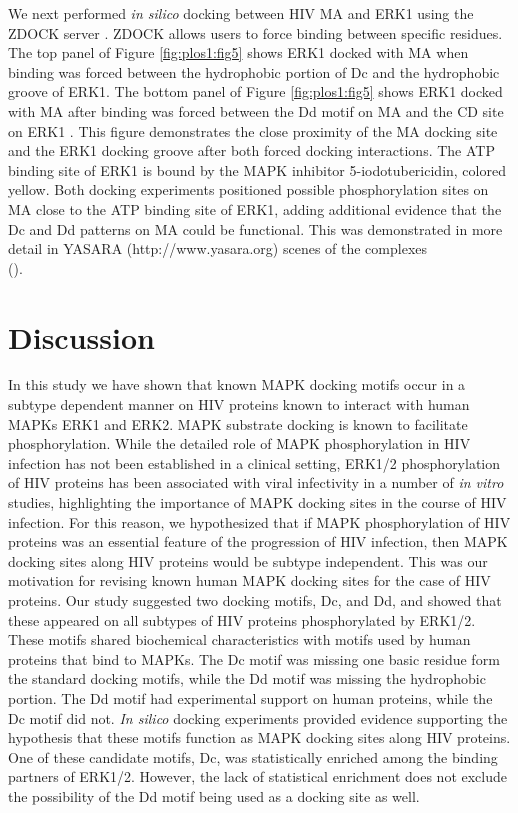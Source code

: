 We next performed \textit{in silico} docking between HIV MA and ERK1 using the
ZDOCK server \cite{chen03}. ZDOCK allows users to force binding
between specific residues. The top panel of Figure
\ref{fig:plos1:fig5} shows ERK1 docked with MA when binding was forced
between the hydrophobic portion of Dc and the hydrophobic groove of
ERK1. The bottom panel of Figure \ref{fig:plos1:fig5} shows ERK1
docked with MA after binding was forced between the Dd motif on MA and
the CD site on ERK1 \cite{kinoshita08}. This figure demonstrates the
close proximity of the MA docking site and the ERK1 docking groove
after both forced docking interactions. The ATP binding site of ERK1 is bound by
the MAPK inhibitor 5-iodotubericidin, colored yellow. Both docking
experiments positioned possible phosphorylation sites on MA close to
the ATP binding site of ERK1, adding additional evidence that the Dc
and Dd patterns on MA could be functional. This was demonstrated in
more detail in YASARA (http://www.yasara.org) scenes of the complexes
\\ ().

\section{Discussion}

In this study we have shown that known MAPK docking motifs occur in a
subtype dependent manner on HIV proteins known to interact with human
MAPKs ERK1 and ERK2. MAPK substrate docking is known to facilitate
phosphorylation. While the detailed role of MAPK phosphorylation in
HIV infection has not been established in a clinical setting, ERK1/2
phosphorylation of HIV proteins has been associated with viral
infectivity in a number of \textit{in vitro} studies, highlighting the
importance of MAPK docking sites in the course of HIV infection. For
this reason, we hypothesized that if MAPK phosphorylation of HIV
proteins was an essential feature of the progression of HIV infection,
then MAPK docking sites along HIV proteins would be subtype
independent. This was our motivation for revising known human MAPK
docking sites for the case of HIV proteins.  Our study suggested two
docking motifs, Dc, and Dd, and showed that these appeared on all
subtypes of HIV proteins phosphorylated by ERK1/2. These motifs shared
biochemical characteristics with motifs used by human proteins that
bind to MAPKs. The Dc motif was missing one basic residue form the
standard docking motifs, while the Dd motif was missing the
hydrophobic portion. The Dd motif had experimental support on human
proteins, while the Dc motif did not. \textit{In silico} docking experiments
provided evidence supporting the hypothesis that these motifs function
as MAPK docking sites along HIV proteins. One of these candidate
motifs, Dc, was statistically enriched among the binding partners of
ERK1/2. However, the lack of statistical enrichment does not exclude
the possibility of the Dd motif being used as a docking site as well.

